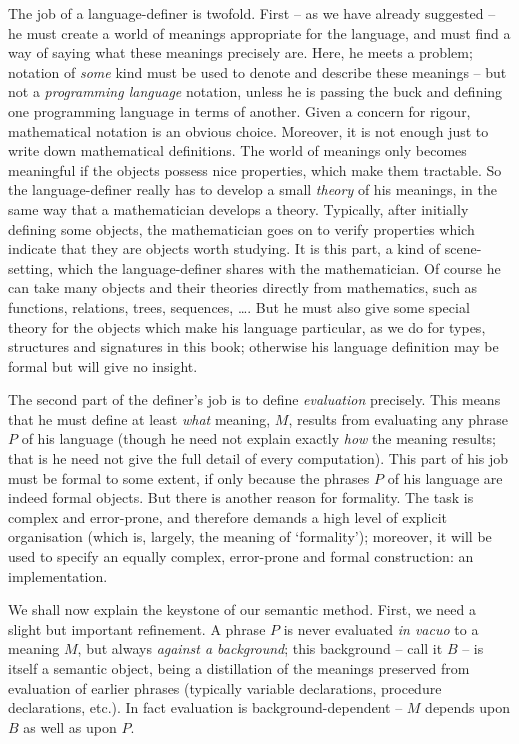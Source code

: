 The job of a language-definer is twofold.  First -- as we have already
suggested -- he must create a world of meanings appropriate for the language,
and must find a way of saying
what these meanings precisely are.  Here, he meets a problem; notation
of {\sl some} kind must be used to denote and describe these meanings --
but not a {\sl programming language} notation, unless he is passing the
buck and defining one programming language in terms of another. Given
a concern for rigour, mathematical notation is an obvious choice.  Moreover,
it is not enough just to
write down mathematical definitions. The world of meanings only becomes
meaningful if the objects possess nice properties, which make them tractable.
So the language-definer really has to develop a small {\sl theory} of his
meanings, in the same way that a mathematician develops a theory.
Typically, after initially defining some objects, the mathematician goes on to
verify properties which indicate that they are objects worth studying.
It is this part, a kind of scene-setting, which the language-definer shares
with the
mathematician.  Of course he can take many objects and their theories
directly from mathematics,  such as functions, relations,
trees, sequences, \ldots. But he must also give some special theory for the
objects which make his language particular, as we do for types, structures and
signatures in this book; otherwise his language definition may be
formal but will give no insight.

The second part of the definer's job is to define {\sl evaluation} precisely.
This means that he must define at least {\sl what} meaning, $M$, results
from evaluating any phrase $P$ of his language (though he need not explain
exactly {\sl how} the meaning results; that is he need not give the full
detail of every computation).  This part of his job must be formal
to some extent, if only because the phrases $P$ of his language are indeed
formal objects.  But there is another reason for formality.  The task is
complex and error-prone, and therefore demands a high level of explicit
organisation (which is, largely, the meaning of `formality'); moreover,
it will be used to specify an equally complex, error-prone and formal
construction: an implementation.

We shall now explain the keystone of our semantic method.  First, we need a
slight but important refinement. A phrase $P$ is never evaluated {\sl in
vacuo} to a meaning $M$, but always {\sl against a background}; this
background -- call it $B$ -- is itself a semantic object,
being a distillation of the meanings
preserved from evaluation of earlier phrases (typically variable declarations,
procedure declarations, etc.).  In fact evaluation is background-dependent
-- $M$ depends upon $B$ as well as upon $P$.

